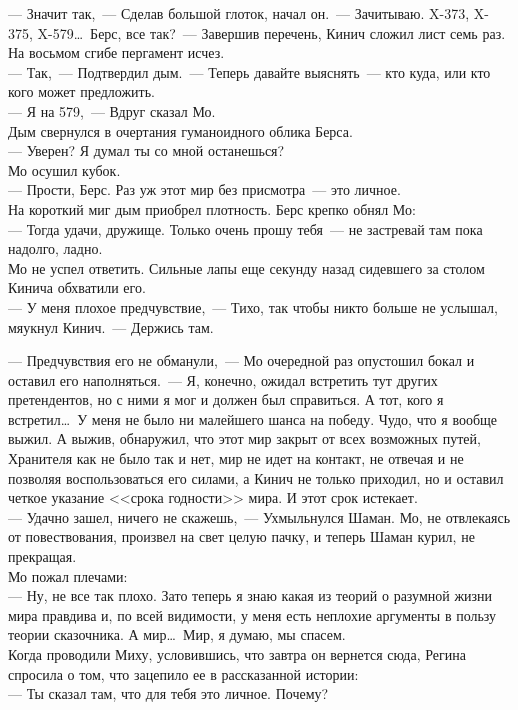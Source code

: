 --- Значит так,~--- Сделав большой глоток, начал он.~--- Зачитываю. X-373, X-375, 
X-579\ldots\ Берс, все так?~--- Завершив перечень, Кинич сложил лист семь раз. 
На восьмом сгибе пергамент исчез.\\
--- Так,~--- Подтвердил дым.~--- Теперь давайте выяснять~--- кто куда, или кто 
кого может предложить.\\
--- Я на 579,~--- Вдруг сказал Мо.\\
Дым свернулся в очертания гуманоидного облика Берса.\\
--- Уверен? Я думал ты со мной останешься?\\
Мо осушил кубок.\\
--- Прости, Берс. Раз уж этот мир без присмотра~--- это личное.\\
На короткий миг дым приобрел плотность. Берс крепко обнял Мо:\\
--- Тогда удачи, дружище. Только очень прошу тебя~--- не застревай там пока 
надолго, ладно.\\
Мо не успел ответить. Сильные лапы еще секунду назад сидевшего за столом Кинича 
обхватили его.\\
--- У меня плохое предчувствие,~--- Тихо, так чтобы никто больше не услышал, 
мяукнул Кинич.~--- Держись там.

\newpage

\noindent --- Предчувствия его не обманули,~--- Мо очередной раз опустошил бокал и оставил 
его наполняться.~--- Я, конечно, ожидал встретить тут других претендентов, но с 
ними я мог и должен был справиться. А тот, кого я встретил\ldots\ У меня не было ни 
малейшего шанса на победу. Чудо, что я вообще выжил. А выжив, обнаружил, что 
этот мир закрыт от всех возможных путей, Хранителя как не было так и нет, мир 
не идет на контакт, не отвечая и не позволяя воспользоваться его силами, а Кинич 
не только приходил, но и оставил четкое указание <<срока годности>> мира. И этот 
срок истекает.\\
--- Удачно зашел, ничего не скажешь,~--- Ухмыльнулся Шаман. Мо, не отвлекаясь от 
повествования, произвел на свет целую пачку, и теперь Шаман курил, не прекращая.\\
Мо пожал плечами:\\
--- Ну, не все так плохо. Зато теперь я знаю какая из теорий о разумной жизни 
мира правдива и, по всей видимости, у меня есть неплохие аргументы в пользу теории 
сказочника. А мир\ldots\ Мир, я думаю, мы спасем.\\
Когда проводили Миху, условившись, что завтра он вернется сюда, Регина спросила 
о том, что зацепило ее в рассказанной истории:\\
--- Ты сказал там, что для тебя это личное. Почему?

